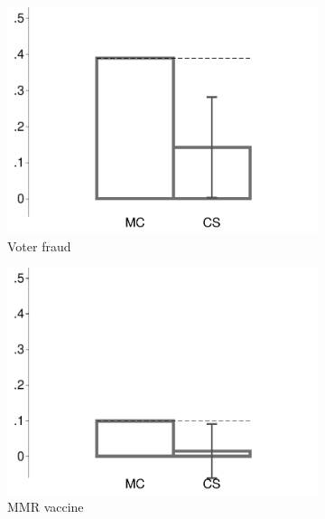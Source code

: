 \begin{figure}[t]
\begin{subfigure}{.325\textwidth}
		\includegraphics[width=\textwidth]{../figs/confidence_score_fraud_study1.pdf}
		\caption{Voter fraud}
	\end{subfigure}
	\hfill
	\begin{subfigure}{.325\textwidth}\centering
		\includegraphics[width=\textwidth]{../figs/confidence_score_mmr_study1.pdf}
		\caption{MMR vaccine}
	\end{subfigure}	
	\hfill
	\begin{subfigure}{.325\textwidth}\centering

\end{subfigure}
\end{figure}
